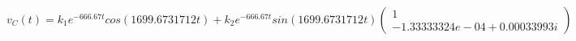 \documentclass[preview]{standalone}
\begin{document}
\begin{center}
$v_C(t) = k_1e^{-666.67t}cos(1699.6731712t) + k_2e^{-666.67t}sin(1699.6731712t)\begin{pmatrix} 1 \\ -1.33333324e-04 + 0.00033993i \end{pmatrix}$
\end{center}
\end{document}
